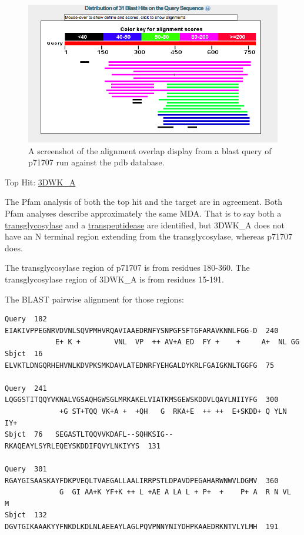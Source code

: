 \documentclass[11pt]{article}
\begin{document}
\begin{figure}[h!]
\centering
\includegraphics[scale=0.75]{Blast-vs-pdb-p71707.png}
\caption{A screenshot of the alignment overlap display from a blast query of 
p71707 run against the pdb database.}
\end{figure}

Top Hit: \href{http://www.ncbi.nlm.nih.gov/protein/208435656?report=genbank&log$=prottop&blast_rank=1&RID=HHF3ZR95015$}{3DWK\_A}

The Pfam analysis of both the top hit and the target are in agreement. Both
Pfam analyses describe approximately the same MDA. That is to say both a 
\href{http://pfam.sanger.ac.uk/family/PF00912.17}{transglycosylase} and a 
\href{http://pfam.sanger.ac.uk/family/PF00905.17}{transpeptidease}
are identified, but 3DWK\_A does not have an N terminal region extending from the
transglycosylase, whereas p71707 does. 

The transglycosylase region of p71707 is from residues 180-360.
The transglycosylase region of 3DWK\_A is from residues 15-191.

The BLAST pairwise alignment for those regions:

\begin{verbatim}
Query  182  EIAKIVPPEGNRVDVNLSQVPMHVRQAVIAAEDRNFYSNPGFSFTGFARAVKNNLFGG-D  240
            E+ K +        VNL  VP  ++ AV+A ED  FY +    +     A+  NL GG  
Sbjct  16   ELVKTLDNGQRHEHVNLKDVPKSMKDAVLATEDNRFYEHGALDYKRLFGAIGKNLTGGFG  75

Query  241  LQGGSTITQQYVKNALVGSAQHGWSGLMRKAKELVIATKMSGEWSKDDVLQAYLNIIYFG  300
             +G ST+TQQ VK+A +  +QH   G  RKA+E  ++ ++  E+SKDD+ Q YLN IY+ 
Sbjct  76   SEGASTLTQQVVKDAFL--SQHKSIG--RKAQEAYLSYRLEQEYSKDDIFQVYLNKIYYS  131

Query  301  RGAYGISAASKAYFDKPVEQLTVAEGALLAALIRRPSTLDPAVDPEGAHARWNWVLDGMV  360
             G  GI AA+K YF+K ++ L +AE A LA L + P+  +    P+ A  R N VL  M 
Sbjct  132  DGVTGIKAAAKYYFNKDLKDLNLAEEAYLAGLPQVPNNYNIYDHPKAAEDRKNTVLYLMH  191
\end{verbatim}
\end{document}
